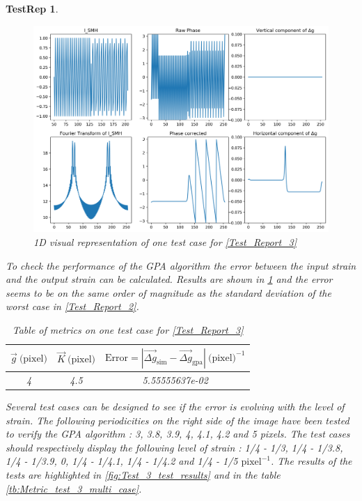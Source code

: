 \documentclass[12pt, titlepage]{article}
\newtheorem{TestRep}{TestRep}
\begin{document}
\begin{TestRep}
\begin{figure}[H]
\begin{center}
\includegraphics[scale=0.5]{Figures/Test_3_explanation_1D.png}
\caption{1D visual representation of one test case for \cref{Test_Report_3}}
\label{fig:Test_3_explanation_1D}
\end{center}
\end{figure}

To check the performance of the GPA algorithm the error between the input strain and the output strain can be calculated. Results are shown in \cref{tb:Metric_test_3_single_case} and the error seems to be on the same order of magnitude as the standard deviation of the worst case in \cref{Test_Report_2}.

\begin{table}[H]
\centering
\begin{tabular}{|c|c|c|}
\hline
$\overrightarrow{g} \ \text{(pixel)}$ & $\overrightarrow{K} \ \text{(pixel)}$ & $\text{Error}=|\overrightarrow{\Delta g}_{\text{sim}}-\overrightarrow{\Delta g}_{\text{gpa}}| \ \text{(pixel)}^{-1}$ \\
\hline
4 & 4.5 & 5.55555637e-02 \\ \hline
\end{tabular}
\caption{Table of metrics on one test case for \cref{Test_Report_3} }\label{tb:Metric_test_3_single_case}
\end{table}

Several test cases can be designed to see if the error is evolving with the level of strain. The following periodicities on the right side of the image have been tested to verify the GPA algorithm : 3, 3.8, 3.9, 4, 4.1, 4.2 and 5 pixels. The test cases should respectively display the following level of strain : 1/4 - 1/3, 1/4 - 1/3.8, 1/4 - 1/3.9, 0, 1/4 - 1/4.1, 1/4 - 1/4.2 and 1/4 - 1/5 $\text{pixel}^{-1}$. The results of the tests are highlighted in \cref{fig:Test_3_test_results} and in the table \cref{tb:Metric_test_3_multi_case}. 


\end{TestRep}
\end{document}
